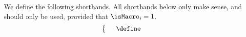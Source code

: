 We define the following shorthands. All shorthands below only make sense, and should only be used, provided that $\isMacro _{i} = 1$.
\[
	\left\{ \begin{array}{lcl}
		& \define &  \\
	\end{array} \right.
\]
